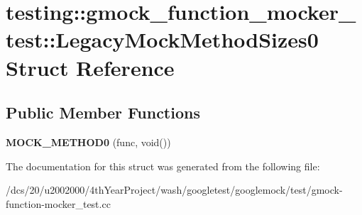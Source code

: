 \hypertarget{structtesting_1_1gmock__function__mocker__test_1_1LegacyMockMethodSizes0}{}\section{testing\+:\+:gmock\+\_\+function\+\_\+mocker\+\_\+test\+:\+:Legacy\+Mock\+Method\+Sizes0 Struct Reference}
\label{structtesting_1_1gmock__function__mocker__test_1_1LegacyMockMethodSizes0}
\subsection*{Public Member Functions}
\begin{DoxyCompactItemize}
\item 
\mbox{\label{structtesting_1_1gmock__function__mocker__test_1_1LegacyMockMethodSizes0_a78f68ce4669c0d1015b399e562af4c8b}} 
{\bfseries M\+O\+C\+K\+\_\+\+M\+E\+T\+H\+O\+D0} (func, void())
\end{DoxyCompactItemize}


The documentation for this struct was generated from the following file\+:\begin{DoxyCompactItemize}
\item 
/dcs/20/u2002000/4th\+Year\+Project/wash/googletest/googlemock/test/gmock-\/function-\/mocker\+\_\+test.\+cc\end{DoxyCompactItemize}
